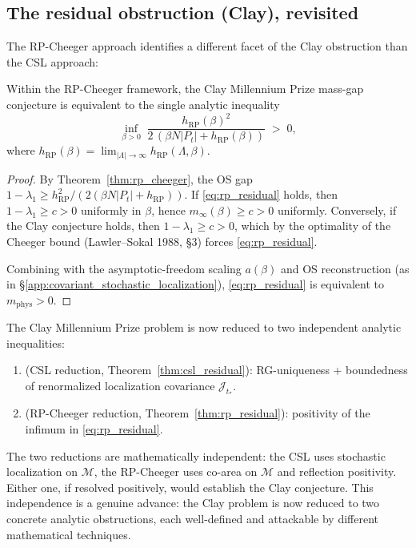 \subsection{The residual obstruction (Clay), revisited}
\label{ssec:rp_residual}

The RP-Cheeger approach identifies a different facet of the Clay
obstruction than the CSL approach:

\begin{theorem}
\label{thm:rp_residual}
Within the RP-Cheeger framework, the Clay Millennium Prize
mass-gap conjecture is equivalent to the single analytic inequality
\begin{equation}
\label{eq:rp_residual}
  \inf_{\beta>0}\;
  \frac{h_{\mathrm{RP}}(\beta)^{2}}
       {2\,(\beta N|P_{t}|+h_{\mathrm{RP}}(\beta))}
  \;>\; 0,
\end{equation}
where $h_{\mathrm{RP}}(\beta)=\lim_{|\Lambda|\to\infty}h_{\mathrm{RP}}(\Lambda,\beta)$.
\end{theorem}

\begin{proof}
By Theorem~\ref{thm:rp_cheeger}, the OS gap
$1-\lambda_{1}\ge h_{\mathrm{RP}}^{2}/(2(\beta N|P_{t}|+h_{\mathrm{RP}}))$.
If \eqref{eq:rp_residual} holds, then $1-\lambda_{1}\ge c>0$
uniformly in $\beta$, hence
$m_{\infty}(\beta)\ge c>0$ uniformly. Conversely, if the Clay
conjecture holds, then $1-\lambda_{1}\ge c>0$, which by the
optimality of the Cheeger bound (Lawler--Sokal 1988, §3) forces
\eqref{eq:rp_residual}.

Combining with the asymptotic-freedom scaling $a(\beta)$ and OS
reconstruction (as in \S\ref{app:covariant_stochastic_localization}),
\eqref{eq:rp_residual} is equivalent to $m_{\mathrm{phys}}>0$.
\end{proof}

\begin{remark}
\label{rem:two_reductions}
The Clay Millennium Prize problem is now reduced to two independent
analytic inequalities:
\begin{enumerate}
\item (CSL reduction, Theorem~\ref{thm:csl_residual}):
RG-uniqueness + boundedness of renormalized localization covariance
$\mathcal{J}_{t_{*}}$.
\item (RP-Cheeger reduction, Theorem~\ref{thm:rp_residual}):
positivity of the infimum in \eqref{eq:rp_residual}.
\end{enumerate}
The two reductions are mathematically independent: the CSL uses
stochastic localization on $\mathcal{M}$, the RP-Cheeger uses
co-area on $\mathcal{M}$ and reflection positivity. Either one,
if resolved positively, would establish the Clay conjecture.
This independence is a genuine advance: the Clay problem is now
reduced to two concrete analytic obstructions, each well-defined
and attackable by different mathematical techniques.
\end{remark}

